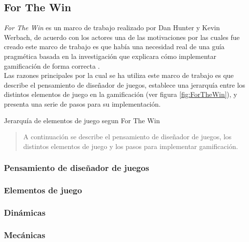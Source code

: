 \subsection{For The Win} \label{sec:ForTheWin}

 {\em For The Win} es un marco de trabajo realizado por Dan Hunter y Kevin Werbach, de acuerdo
 con los actores una de las motivaciones por las cuales fue creado este marco de trabajo es que
 había una necesidad real de una guía pragmética basada en la investigación que explicara cómo
 implementar gamificación de forma correcta \cite{ForTheWin}.\\
 
 \noindent Las razones principales por la cual se ha utiliza este marco de trabajo es que describe
 el pensamiento de diseñador de juegos, establece una jerarquía entre los distintos elementos de
 juego en la gamificación (ver figura \ref{fig:ForTheWin}), y presenta una serie de pasos para
 su implementación.

        {Jerarquía de elementos de juego segun For The Win}

 \begin{quote}
    A continuación se describe el pensamiento de diseñador de juegos, los distintos elementos
    de juego y los pasos para implementar gamificación.
 \end{quote}

 
\subsubsection{Pensamiento de diseñador de juegos}
   
\subsubsection{Elementos de juego}
\subsubsection{Dinámicas}
\subsubsection{Mecánicas}
